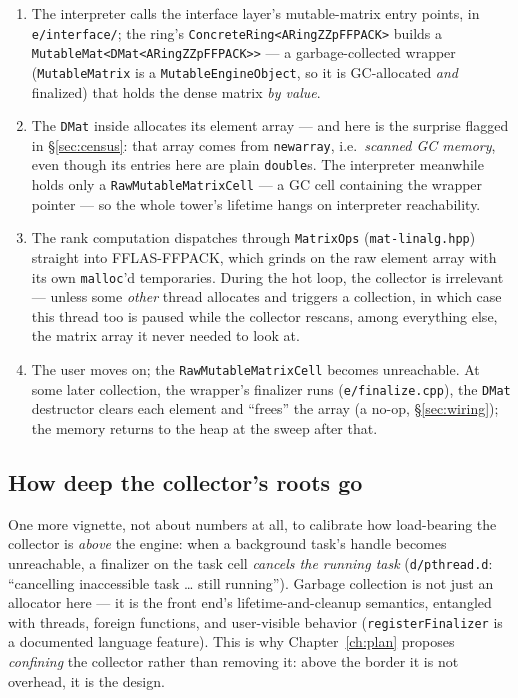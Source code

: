 \documentclass[11pt,oneside]{report}
\newcommand{\code}[1]{\textcolor{m2code}{\texttt{#1}}}
\newcommand{\file}[1]{\textcolor{m2file}{\texttt{#1}}}
\begin{document}
\begin{enumerate}
\item The interpreter calls the interface layer's mutable-matrix
  entry points, in \file{e/interface/}; the ring's
  \code{ConcreteRing<ARingZZpFFPACK>} builds a
  \code{MutableMat<DMat<ARingZZpFFPACK>>} --- a garbage-collected wrapper
  (\code{MutableMatrix} is a \code{MutableEngineObject}, so it is
  GC-allocated \emph{and} finalized) that holds the dense matrix
  \emph{by value}.
\item The \code{DMat} inside allocates its element array --- and here is
  the surprise flagged in \S\ref{sec:census}: that array comes from
  \code{newarray}, i.e.\ \emph{scanned GC memory}, even though its entries
  here are plain \code{double}s. The interpreter meanwhile holds only a
  \code{RawMutableMatrixCell} --- a GC cell containing the wrapper pointer
  --- so the whole tower's lifetime hangs on interpreter reachability.
\item The rank computation dispatches through \code{MatrixOps}
  (\file{mat-linalg.hpp}) straight into FFLAS-FFPACK, which grinds on the raw element array with its own
  \code{malloc}'d temporaries. During the hot loop, the collector is
  irrelevant --- unless some \emph{other} thread allocates and triggers a
  collection, in which case this thread too is paused while the collector
  rescans, among everything else, the matrix array it never needed to look
  at.
\item The user moves on; the \code{RawMutableMatrixCell} becomes
  unreachable. At some later collection, the wrapper's finalizer runs
  (\file{e/finalize.cpp}), the \code{DMat} destructor clears each element
  and ``frees'' the array (a no-op, \S\ref{sec:wiring}); the memory
  returns to the heap at the sweep after that.
\end{enumerate}

\subsection{How deep the collector's roots go}

One more vignette, not about numbers at all, to calibrate how load-bearing
the collector is \emph{above} the engine: when a background task's handle
becomes unreachable, a finalizer on the task cell \emph{cancels the running
task} (\file{d/pthread.d}: ``cancelling inaccessible task \ldots{} still
running''). Garbage collection is not just an allocator here --- it is the
front end's lifetime-and-cleanup semantics, entangled with threads, foreign
functions, and user-visible behavior (\code{registerFinalizer} is a
documented language feature). This is why Chapter~\ref{ch:plan} proposes
\emph{confining} the collector rather than removing it: above the border it
is not overhead, it is the design.
\end{document}
